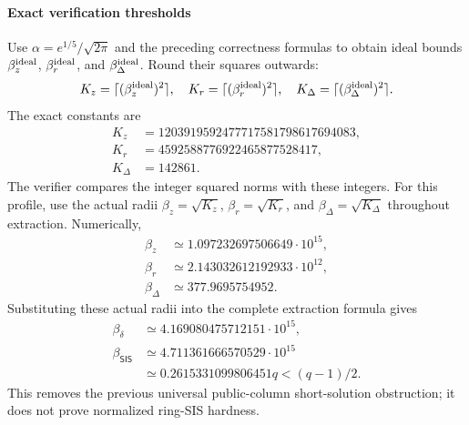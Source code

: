 \documentclass[lettersize,journal]{IEEEtran}
\begin{document}
\paragraph{Exact verification thresholds}
Use $\alpha=e^{1/5}/\sqrt{2\pi}$ and the preceding correctness formulas
to obtain ideal bounds $\beta_z^{\rm ideal}$, $\beta_r^{\rm ideal}$,
and $\beta_\Delta^{\rm ideal}$. Round their squares outwards:
\[
K_z=\lceil(\beta_z^{\rm ideal})^2\rceil,\quad
K_r=\lceil(\beta_r^{\rm ideal})^2\rceil,\quad
K_\Delta=\lceil(\beta_\Delta^{\rm ideal})^2\rceil.
\]
The exact constants are
\[
\begin{aligned}
K_z&=1203919592477717581798617694083,\\
K_r&=4592588776922465877528417,\\
K_\Delta&=142861.
\end{aligned}
\]
The verifier compares the integer squared norms with these integers.
For this profile, use the actual radii
$\beta_z=\sqrt{K_z}$, $\beta_r=\sqrt{K_r}$, and
$\beta_\Delta=\sqrt{K_\Delta}$ throughout extraction. Numerically,
\[
\begin{aligned}
\beta_z&\simeq1.097232697506649\cdot10^{15},\\
\beta_r&\simeq2.143032612192933\cdot10^{12},\\
\beta_\Delta&\simeq377.9695754952.
\end{aligned}
\]
Substituting these actual radii into the complete extraction formula gives
\[
\begin{aligned}
\beta_\delta&\simeq4.169080475712151\cdot10^{15},\\
\beta_{\mathsf{SIS}}&\simeq4.711361666570529\cdot10^{15}\\
&\simeq0.2615331099806451q<(q-1)/2.
\end{aligned}
\]
This removes the previous universal public-column short-solution
obstruction; it does not prove normalized ring-SIS hardness.
\end{document}
